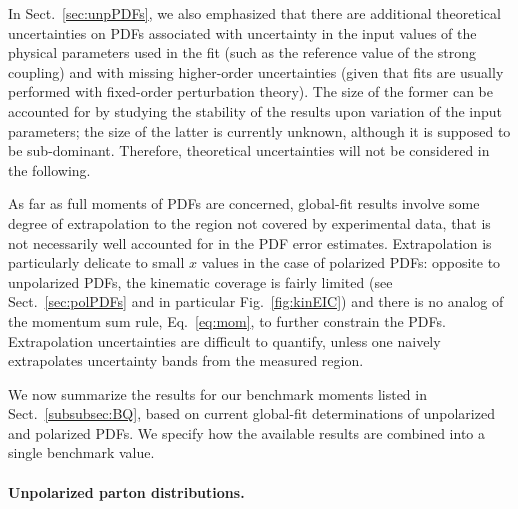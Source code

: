 In Sect.~\ref{sec:unpPDFs}, we also emphasized that there are additional 
theoretical uncertainties on PDFs associated with uncertainty in
the input values of the physical parameters used in the fit (such as the 
reference value of the strong coupling) and with missing higher-order
uncertainties (given that fits are usually performed with fixed-order
perturbation theory).
%
The size of the former can be accounted for by studying the stability of the 
results upon variation of the input parameters; the size of the latter is
currently unknown, although it is supposed to be sub-dominant.
%
Therefore, theoretical uncertainties will not be considered in the following.

As far as full moments of PDFs are concerned, global-fit results involve
some degree of extrapolation to the region not covered by experimental data, 
that is not necessarily well accounted for in the PDF error estimates.
%
Extrapolation is particularly delicate to small $x$ values in the case of 
polarized PDFs: opposite to unpolarized PDFs, the kinematic coverage is 
fairly limited (see Sect.~\ref{sec:polPDFs} and in particular 
Fig.~\ref{fig:kinEIC}) and there is no analog of the momentum sum rule,
Eq.~\eqref{eq:mom}, to further constrain the PDFs.
%
Extrapolation uncertainties are difficult to quantify, unless
one naively extrapolates uncertainty bands from the measured region.

We now summarize the results for our benchmark moments listed in 
Sect.~\ref{subsubsec:BQ}, based on current global-fit determinations of
unpolarized and polarized PDFs.
%
We specify how the
available results are combined into a single benchmark value.

\paragraph{Unpolarized parton distributions.}

